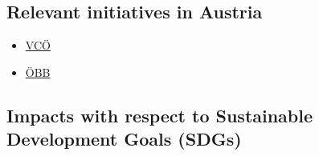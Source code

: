 \documentclass[
]{book}
\providecommand{\tightlist}{%
  \setlength{\itemsep}{0pt}\setlength{\parskip}{0pt}}
\begin{document}
\hypertarget{relevant-initiatives-in-austria-31}{%
\subsection*{Relevant initiatives in Austria}\label{relevant-initiatives-in-austria-31}}

\begin{itemize}
\tightlist
\item
  \href{https://www.vcoe.at/presse/presseaussendungen/detail/carsharing-haushalte-potential-2018}{VCÖ}
\item
  \href{https://www.carsharing-wien.com/anbieter/oebb-rail-and-drive}{ÖBB}
\end{itemize}

\hypertarget{impacts-with-respect-to-sustainable-development-goals-sdgs-31}{%
\subsection*{Impacts with respect to Sustainable Development Goals (SDGs)}\label{impacts-with-respect-to-sustainable-development-goals-sdgs-31}}
\end{document}
